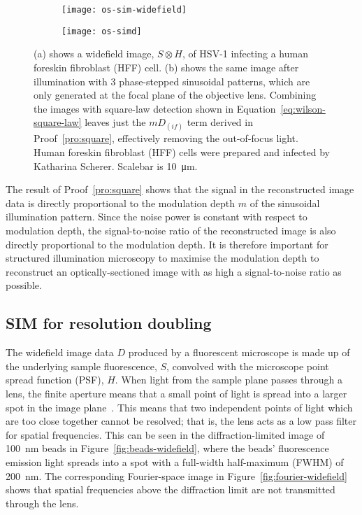 \begin{figure}[tb]
\centering
\begin{subfigure}[b]{0.49\textwidth}
	\texttt{[image: os-sim-widefield]}
	\caption{}\label{fig:os-sim-widefield}
\end{subfigure}
\hfill
\begin{subfigure}[b]{0.49\textwidth}
	\texttt{[image: os-simd]}
	\caption{}\label{fig:os-sim}
\end{subfigure}
\caption[LAG SIM: Structured illumination can be used to computationally remove out-of-focus light]{(a) shows a widefield image, $S \otimes H$, of HSV-1 infecting a human foreskin fibroblast (HFF) cell. (b) shows the same image after illumination with 3 phase-stepped sinusoidal patterns, which are only generated at the focal plane of the objective lens. Combining the images with square-law detection shown in Equation~\ref{eq:wilson-square-law} leaves just the $mD_{\left(if\right)}$ term derived in Proof~\ref{pro:square}, effectively removing the out-of-focus light. Human foreskin fibroblast (HFF) cells were prepared and infected by Katharina Scherer. Scalebar is \SI{10}{\micro\metre}. }
\label{fig:os-sim-comparison}
\end{figure}

The result of Proof~\ref{pro:square} shows that the signal in the reconstructed image data is directly proportional to the modulation depth $m$ of the sinusoidal illumination pattern.
Since the noise power is constant with respect to modulation depth, the signal-to-noise ratio of the reconstructed image is also directly proportional to the modulation depth.
It is therefore important for structured illumination microscopy to maximise the modulation depth to reconstruct an optically-sectioned image with as high a signal-to-noise ratio as possible.

\subsection{SIM for resolution doubling} \label{sec:SIM-theory}
The widefield image data $D$ produced by a fluorescent microscope is made up of the underlying sample fluorescence, $S$, convolved with the microscope point spread function (PSF), $H$.
When light from the sample plane passes through a lens, the finite aperture means that a small point of light is spread into a larger spot in the image plane~\cite[\textit{ch. 11}]{hecht2017optics}.
This means that two independent points of light which are too close together cannot be resolved; that is, the lens acts as a low pass filter for spatial frequencies.
This can be seen in the diffraction-limited image of \SI{100}{\nano\metre} beads in Figure~\ref{fig:beads-widefield}, where the beads' fluorescence emission light spreads into a spot with a full-width half-maximum (FWHM) of \SI{200}{\nano\metre}.
The corresponding Fourier-space image in Figure~\ref{fig:fourier-widefield} shows that spatial frequencies above the diffraction limit are not transmitted through the lens.


